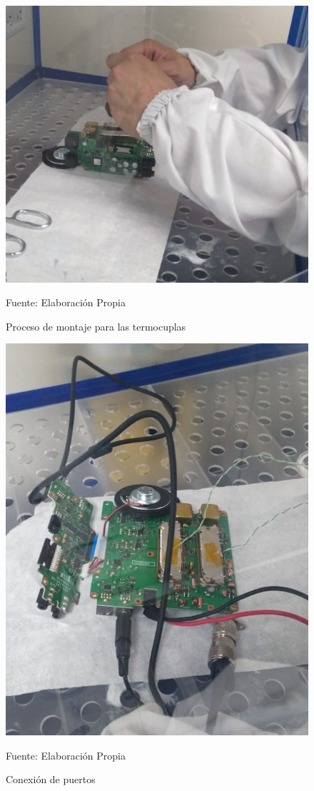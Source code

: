 \begin{figure}[H]
\centering
\includegraphics[scale=0.5]{Figuras/Montaje_4.jpeg}
\caption{Proceso de montaje para las termocuplas}
Fuente: Elaboración Propia
\label{anexo14}
\end{figure}

\begin{figure}[H]
\centering
\includegraphics[scale=0.5]{Figuras/Montaje_6.jpeg}
\caption{Conexión de puertos}
Fuente: Elaboración Propia
\label{anexo15}
\end{figure}

